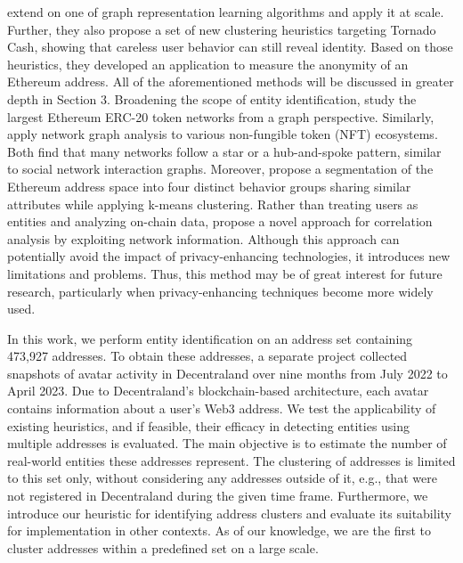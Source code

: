 \documentclass[12pt,a4paper,titlepage,oneside,english]{article}
\begin{document}
\cite{wu2022tutela} extend on one of \cite{Beres2020} graph representation learning algorithms and apply it at scale. Further, they also propose a set of new clustering heuristics targeting Tornado Cash,  showing that careless user behavior can still reveal identity. Based on those heuristics, they developed an application to measure the anonymity of an Ethereum address. All of the aforementioned methods will be discussed in greater depth in Section 3. \newline
Broadening the scope of entity identification, \cite{victorlüders2019} study the largest Ethereum ERC-20 token networks from a graph perspective. Similarly, \cite{casalebrunet2021} apply network graph analysis to various non-fungible token (NFT) ecosystems. Both find that many networks follow a star or a hub-and-spoke pattern, similar to social network interaction graphs. Moreover, \cite{Payette2017} propose a segmentation of the Ethereum address space into four distinct behavior groups sharing similar attributes while applying k-means clustering. \newline
Rather than treating users as entities and analyzing on-chain data, \cite{yu2023} propose a novel approach for correlation analysis by exploiting network information. Although this approach can potentially avoid the impact of privacy-enhancing technologies, it introduces new limitations and problems. Thus, this method may be of great interest for future research, particularly when privacy-enhancing techniques become more widely used.

In this work, we perform entity identification on an address set containing 473,927 addresses. To obtain these addresses, a separate project collected snapshots of avatar activity in Decentraland over nine months from July 2022 to April 2023. Due to Decentraland's blockchain-based architecture, each avatar contains information about a user's Web3 address. \newline
We test the applicability of existing heuristics, and if feasible, their efficacy in detecting entities using multiple addresses is evaluated.
The main objective is to estimate the number of real-world entities these addresses represent. The clustering of addresses is limited to this set only, without considering any addresses outside of it, e.g., that were not registered in Decentraland during the given time frame. Furthermore, we introduce our heuristic for identifying address clusters and evaluate its suitability for implementation in other contexts. As of our knowledge, we are the first to cluster addresses within a predefined set on a large scale.
\end{document}
